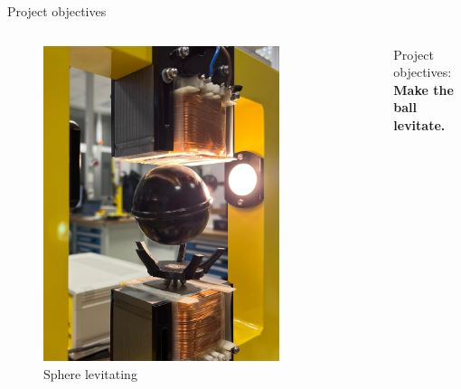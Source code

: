 \begin{frame}{Project objectives}

    \vspace{9pt}

    \begin{columns}[c, onlytextwidth]

        \begin{column}{0.5\textwidth}

            \begin{figure}[H]
                \centering
                \includegraphics[width=0.8\textwidth]{./img/ball_levitation.jpeg}
                \caption{Sphere levitating}
            \end{figure}

        \end{column}

        \begin{column}{0.5\textwidth}

            \begin{center}
                Project objectives: \\
                \textbf{Make the ball levitate.}
            \end{center}

        \end{column}

    \end{columns}

\end{frame}


